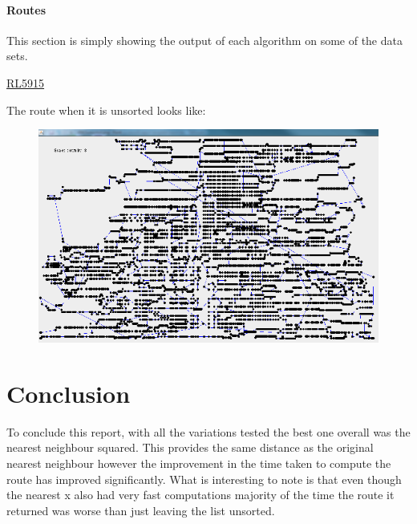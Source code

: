 \documentclass[conference,backref=page]{acmsiggraph}
\begin{document}
\paragraph{Routes}

This section is simply showing the output of each algorithm on some of the data sets. 

\underline{RL5915}

The route when it is unsorted looks like:

\begin{figure}
\includegraphics[width=\columnwidth]{images/rl5915nn.png}
\end{figure}



\section{Conclusion}


To conclude this report, with all the variations tested the best one overall was the nearest neighbour squared. This provides the same distance as the original nearest neighbour however the improvement in the time taken to compute the route has improved significantly. What is interesting to note is that even though the nearest x also had very fast computations majority of the time the route it returned was worse than just leaving the list unsorted. 







\end{document}
